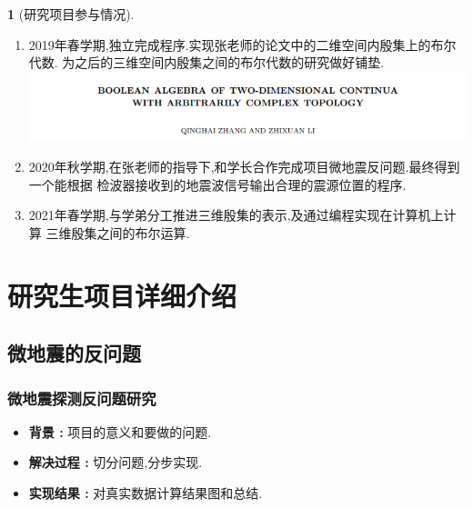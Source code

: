 \documentclass[UTF8]{ctexbeamer}	%
\theoremstyle{plain}
\theoremstyle{definition}
\newtheorem{emt}{}[section]
\theoremstyle{remark}
\numberwithin{equation}{section}
\begin{document}
\begin{frame}[fragile]
   \begin{emt} [研究项目参与情况]
    \begin{enumerate}
        \item 2019年春学期,独立完成程序.实现张老师的论文中的二维空间内殷集上的布尔代数.
        为之后的三维空间内殷集之间的布尔代数的研究做好铺垫.
        \includegraphics[width = \linewidth]{fig/articlename1.png}
        \item 2020年秋学期,在张老师的指导下,和学长合作完成项目微地震反问题.最终得到一个能根据
        检波器接收到的地震波信号输出合理的震源位置的程序.
        \item 2021年春学期,与学弟分工推进三维殷集的表示,及通过编程实现在计算机上计算
        三维殷集之间的布尔运算.
    \end{enumerate}
   \end{emt}
\end{frame}

\section{研究生项目详细介绍}
\subsection{微地震的反问题}

\begin{frame}
    \frametitle{微地震探测反问题研究}
    \begin{itemize}
        \setlength{\itemsep}{30pt}
        \item \textbf{背景 : } 项目的意义和要做的问题.
        \item  \textbf{解决过程 : } 切分问题,分步实现.
        \item \textbf{实现结果 : } 对真实数据计算结果图和总结.
    \end{itemize}
\end{frame}
\end{document}
